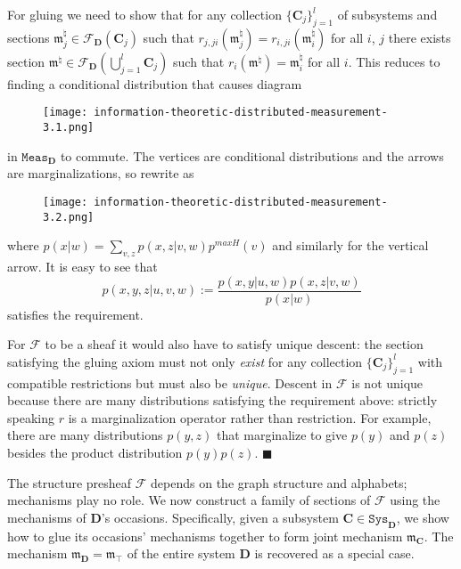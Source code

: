 \documentclass[12pt]{article}
\newcommand{\univ}{{\mathbf D}}
\newcommand{\mangle}{{\mathbf C}}
\newcommand{\psheaf}{{\mathcal F}}
\newcommand{\subs}{{\mathtt{Sys}}}
\newcommand{\mcat}{{\mathtt{Meas}}}
\newcommand{\eop}{{$\blacksquare$}}
\newcommand{\fm}{{\mathfrak m}}
\theoremstyle{remark}
\begin{document}
For gluing we need to show that for any collection 
$\{\mangle_j\}_{j=1}^l$ of subsystems and sections 
$\fm_j^\natural \in \psheaf_\univ(\mangle_j)$ such that 
$r_{j,ji}(\fm_j^\natural)=r_{i,ji}(\fm_i^\natural)$ 
for all $i$, $j$ there exists section $\fm^\natural\in
\psheaf_\univ\left(\bigcup_{j=1}^l\mangle_j\right)$ such that 
$r_i(\fm^\natural)=\fm^\natural_i$ for all $i$. This reduces 
to finding a conditional distribution that causes diagram 
\begin{figure}
 \centering
 \texttt{[image: information-theoretic-distributed-measurement-3.1.png]}
\end{figure}
in $\mcat_\univ$ to commute. The vertices are conditional distributions and the arrows are marginalizations, so rewrite as
\begin{figure}
 \centering
 \texttt{[image: information-theoretic-distributed-measurement-3.2.png]}
\end{figure}
where $p(x|w)=\sum_{v,z}p(x,z|v,w)p^{maxH}(v)$ and similarly 
for the vertical arrow. It is easy to see that
\begin{equation*}
	p(x,y,z|u,v,w):=\frac{p(x,y|u,w)p(x,z|v,w)}{p(x|w)}
\end{equation*}
satisfies the requirement.

For $\psheaf$ to be a sheaf it would also have to satisfy 
unique descent: the section satisfying the gluing axiom must 
not only \emph{exist} for any collection 
$\{\mangle_j\}_{j=1}^l$ with compatible restrictions but must 
also be \emph{unique}. Descent in $\psheaf$ is not unique 
because there are many distributions satisfying the requirement
above: strictly speaking $r$ is a marginalization operator 
rather than restriction. For example, there are many 
distributions $p(y,z)$ that marginalize to give $p(y)$ and 
$p(z)$ besides the product distribution $p(y)p(z)$.
\eop

The structure presheaf $\psheaf$ depends on the graph 
structure and alphabets; mechanisms play no role. We now 
construct a family of sections of $\psheaf$ using the 
mechanisms of $\univ$'s occasions. Specifically, given a 
subsystem $\mangle\in \subs_\univ$, we show how to glue its 
occasions' mechanisms together to form joint mechanism 
$\fm_\mangle$. The mechanism $\fm_\univ=\fm_\top$ of the 
entire system $\univ$ is recovered as a special case. 
\end{document}
